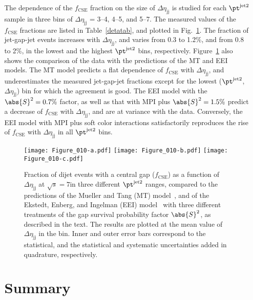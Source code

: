 \documentclass[11pt,twoside,a4paper,cmspaper,final,collab]{cms-tdr}
\begin{document}
The dependence of the $f_\mathrm{CSE}$ fraction on the size of $\Delta\eta_\mathrm{jj}$ is studied for each $\pt^\text{jet2}$ sample in three bins of $\Delta\eta_\mathrm{jj}$ = 3--4, 4--5, and 5--7. The measured values of the $f_\mathrm{CSE}$ fractions are listed in Table~\ref{detatab}, and plotted in Fig.~\ref{fineta}. The fraction of jet-gap-jet events increases with $\Delta\eta_\mathrm{jj}$, and varies from 0.3 to 1.2\%, and from 0.8 to 2\%, in the lowest and the highest $\pt^\text{jet2}$ bins, respectively. Figure~\ref{fineta} also shows the comparison of the data with the predictions of the MT and EEI models. The MT model predicts a flat dependence of $f_\mathrm{CSE}$ with $\Delta\eta_\mathrm{jj}$, and underestimates the measured jet-gap-jet fractions except for the lowest ($\pt^\text{jet2}$, $\Delta\eta_\mathrm{jj}$) bin for which the agreement is good. The EEI model with the $\abs{S}^2=0.7\%$ factor, as well as that with MPI plus $\abs{S}^2=1.5\%$ predict a decrease of $f_\mathrm{CSE}$ with $\Delta\eta_\mathrm{jj}$, and are at variance with the data. Conversely, the EEI model with MPI plus soft color interactions satisfactorily reproduces the rise of $f_\mathrm{CSE}$ with $\Delta\eta_\mathrm{jj}$ in all $\pt^\text{jet2}$ bins.

\begin{figure} \centering
\texttt{[image: Figure\_010-a.pdf]}
\texttt{[image: Figure\_010-b.pdf]}
\texttt{[image: Figure\_010-c.pdf]}
\caption{Fraction of dijet events with a central gap ($f_\mathrm{CSE}$) as a function of $\Delta\eta_\mathrm{jj}$ at $\sqrt{s}=7$\TeV in three different $\pt^\text{jet2}$ ranges, compared to the predictions of the Mueller and Tang (MT) model~\cite{mt}, and of the Ekstedt, Enberg, and Ingelman (EEI) model~\cite{csp,cspLHC} with three different treatments of the gap survival probability factor $\abs{S}^2$, as described in the text. The results are plotted at the mean value of $\Delta\eta_\mathrm{jj}$ in the bin. Inner and outer error bars correspond to the statistical, and the statistical and systematic uncertainties added in quadrature, respectively.}
\label{fineta}
\end{figure}

\section{Summary}
\end{document}
